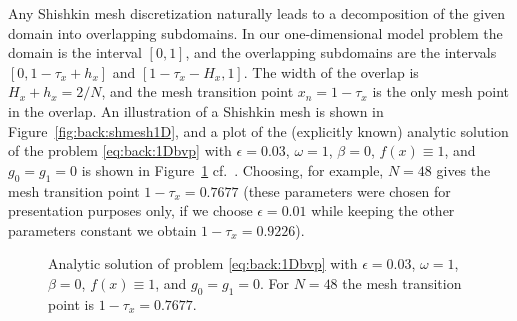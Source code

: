 Any Shishkin mesh discretization naturally leads to a decomposition of the
given domain into overlapping subdomains. In our one-dimensional model problem
the domain is the interval $[0,1]$, and the overlapping subdomains are the
intervals $[0,1-\tau_x+h_x]$ and $[1-\tau_x-H_x,1]$.
The width of the overlap is $H_x+h_x=2/N$, and the mesh transition point
$x_n=1-\tau_x$ is the only mesh point in the overlap.
An illustration of a Shishkin mesh is shown in Figure~\ref{fig:back:shmesh1D},
and a plot of the (explicitly known) analytic solution of the problem
\eqref{eq:back:1Dbvp} with $\epsilon=0.03$, $\omega=1$, $\beta=0$,
$f(x)\equiv 1$, and $g_0=g_1=0$ is shown in Figure~\ref{fig:back:1D_analytic_sol}
cf.~\cite[Example~3.1]{Sty05}. Choosing, for example, $N=48$ gives the mesh
transition point $1-\tau_x=0.7677$ (these parameters were chosen for
presentation purposes only, if we choose $\epsilon=0.01$ while keeping the
other parameters constant we obtain $1-\tau_x=0.9226$).

\begin{figure}[h!]
\centering
{}
\caption{Analytic solution of problem \eqref{eq:back:1Dbvp} with $\epsilon=0.03$, $\omega=1$, $\beta=0$, $f(x)\equiv 1$, and $g_0=g_1=0$. For $N=48$ the mesh transition point is $1-\tau_x = 0.7677$.}
\label{fig:back:1D_analytic_sol}
\end{figure}
%

